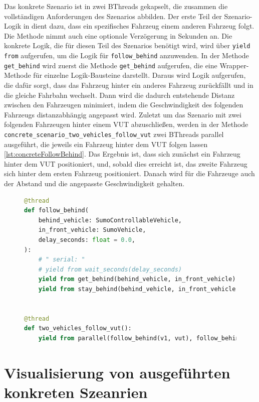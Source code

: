 Das konkrete Szenario ist in zwei BThreads gekapselt, die zusammen die vollständigen Anforderungen des Szenarios abbilden. Der erste Teil der Szenario-Logik in dient dazu, dass ein spezifisches Fahrzeug einem anderen Fahrzeug folgt. Die Methode nimmt auch eine optionale Verzögerung in Sekunden an.
Die konkrete Logik, die für diesen Teil des Szenarios benötigt wird, wird über \texttt{yield from} aufgerufen, um die Logik für \texttt{follow\_behind} anzuwenden. In der Methode \texttt{get\_behind} wird zuerst die Methode \texttt{get\_behind} aufgerufen, die eine Wrapper-Methode für einzelne Logik-Bausteine darstellt.
Daraus wird Logik aufgerufen, die dafür sorgt, dass das Fahrzeug hinter ein anderes Fahrzeug zurückfällt und in die gleiche Fahrbahn wechselt. Dann wird die dadurch entstehende Distanz zwischen den Fahrzeugen minimiert, indem die Geschwindigkeit des folgenden Fahrzeugs distanzabhängig angepasst wird.
Zuletzt um das Szenario mit zwei folgenden Fahrzeugen hinter einem VUT abzuschließen, werden in der Methode \texttt{concrete\_scenario\_two\_vehicles\_follow\_vut} zwei BThreads parallel ausgeführt, die jeweils ein Fahrzeug hinter dem VUT folgen lassen \ref{lst:concreteFollowBehind}.
Das Ergebnis ist, dass sich zunächst ein Fahrzeug hinter dem VUT positioniert, und, sobald dies erreicht ist, das zweite Fahrzeug sich hinter dem ersten Fahrzeug positioniert. Danach wird für die Fahrzeuge auch der Abstand und die angepasste Geschwindigkeit gehalten.
\begin{figure}[ht]
\begin{lstlisting}[language=Python, caption=Konkretes Szenario: Zwei Fahrzeuge folgen dem VUT - Relevante BThreads, basicstyle=\ttfamily\small, label={lst:concreteFollowBehind}]
@thread
def follow_behind(
    behind_vehicle: SumoControllableVehicle,
    in_front_vehicle: SumoVehicle,
    delay_seconds: float = 0.0,
):
    # " serial: "
    # yield from wait_seconds(delay_seconds)
    yield from get_behind(behind_vehicle, in_front_vehicle)
    yield from stay_behind(behind_vehicle, in_front_vehicle)


@thread
def two_vehicles_follow_vut():
    yield from parallel(follow_behind(v1, vut), follow_behind(v2, v1))
\end{lstlisting}
\end{figure}
\clearpage

\section{Visualisierung von ausgeführten konkreten Szeanrien}
\label{sec:visualisierung_von_ausgefuehrten_konkreten_szenarien}

